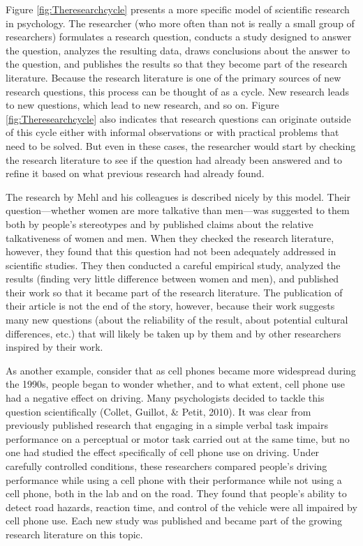 \documentclass[]{book}
\theoremstyle{definition}
\theoremstyle{definition}
\theoremstyle{remark}
\begin{document}
Figure \ref{fig:Theresearchcycle} presents a more specific model of
scientific research in psychology. The researcher (who more often than
not is really a small group of researchers) formulates a research
question, conducts a study designed to answer the question, analyzes the
resulting data, draws conclusions about the answer to the question, and
publishes the results so that they become part of the research
literature. Because the research literature is one of the primary
sources of new research questions, this process can be thought of as a
cycle. New research leads to new questions, which lead to new research,
and so on. Figure \ref{fig:Theresearchcycle} also indicates that
research questions can originate outside of this cycle either with
informal observations or with practical problems that need to be solved.
But even in these cases, the researcher would start by checking the
research literature to see if the question had already been answered and
to refine it based on what previous research had already found.

The research by Mehl and his colleagues is described nicely by this
model. Their question---whether women are more talkative than men---was
suggested to them both by people's stereotypes and by published claims
about the relative talkativeness of women and men. When they checked the
research literature, however, they found that this question had not been
adequately addressed in scientific studies. They then conducted a
careful empirical study, analyzed the results (finding very little
difference between women and men), and published their work so that it
became part of the research literature. The publication of their article
is not the end of the story, however, because their work suggests many
new questions (about the reliability of the result, about potential
cultural differences, etc.) that will likely be taken up by them and by
other researchers inspired by their work.

As another example, consider that as cell phones became more widespread
during the 1990s, people began to wonder whether, and to what extent,
cell phone use had a negative effect on driving. Many psychologists
decided to tackle this question scientifically (Collet, Guillot, \&
Petit, 2010). It was clear from previously published research that
engaging in a simple verbal task impairs performance on a perceptual or
motor task carried out at the same time, but no one had studied the
effect specifically of cell phone use on driving. Under carefully
controlled conditions, these researchers compared people's driving
performance while using a cell phone with their performance while not
using a cell phone, both in the lab and on the road. They found that
people's ability to detect road hazards, reaction time, and control of
the vehicle were all impaired by cell phone use. Each new study was
published and became part of the growing research literature on this
topic.
\end{document}
